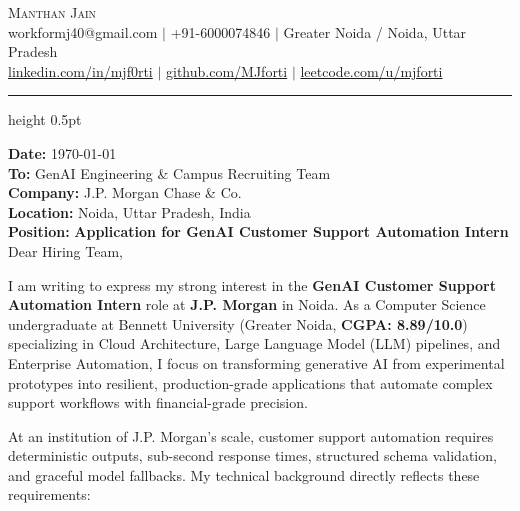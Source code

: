 \documentclass[letterpaper,10pt]{article}
\begin{document}
\begin{center}
  {\Huge \scshape Manthan Jain} \\[6pt]
  \small 
  workformj40@gmail.com \hspace{8pt}$|$\hspace{8pt} +91-6000074846 \hspace{8pt}$|$\hspace{8pt} Greater Noida / Noida, Uttar Pradesh \\[3pt]
  \href{https://www.linkedin.com/in/mjf0rti}{linkedin.com/in/mjf0rti} \hspace{8pt}$|$\hspace{8pt} \href{https://github.com/MJforti}{github.com/MJforti} \hspace{8pt}$|$\hspace{8pt} \href{https://leetcode.com/u/mjforti_/}{leetcode.com/u/mjforti}
\end{center}

\vspace{-6pt}
\hrule height 0.5pt
\vspace{8pt}

\small
\textbf{Date:} \today \\[3pt]
\textbf{To:} GenAI Engineering \& Campus Recruiting Team \\
\textbf{Company:} J.P. Morgan Chase \& Co. \\
\textbf{Location:} Noida, Uttar Pradesh, India \\
\textbf{Position:} \textbf{Application for GenAI Customer Support Automation Intern} \\[6pt]

Dear Hiring Team,

\vspace{3pt}
I am writing to express my strong interest in the \textbf{GenAI Customer Support Automation Intern} role at \textbf{J.P. Morgan} in Noida. As a Computer Science undergraduate at Bennett University (Greater Noida, \textbf{CGPA: 8.89/10.0}) specializing in Cloud Architecture, Large Language Model (LLM) pipelines, and Enterprise Automation, I focus on transforming generative AI from experimental prototypes into resilient, production-grade applications that automate complex support workflows with financial-grade precision.

At an institution of J.P. Morgan's scale, customer support automation requires deterministic outputs, sub-second response times, structured schema validation, and graceful model fallbacks. My technical background directly reflects these requirements:
\end{document}
